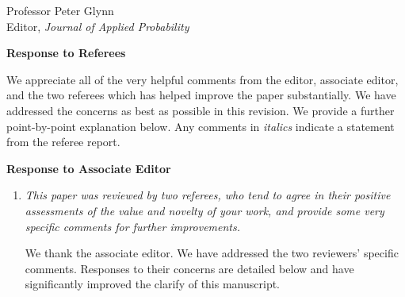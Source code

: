 \documentclass[11pt]{letter} %
\begin{document}

\begin{letter}{Professor
	Peter Glynn\\
	Editor, {\em Journal of Applied Probability}}



\signature{Walter Dempsey\\
University of Michigan\\
Department of Biostatistics\\
1415 Washington Heights\\
Ann Arbor, MI 48103} %


\vspace{5mm}

\newpage

{\bf Response to Referees}

We appreciate all of the very helpful comments from the editor, associate editor, and the two referees which has helped improve the paper substantially. We have addressed the concerns as best as possible in this revision. We provide a further point-by-point explanation below. Any comments in {\it italics} indicate a statement from the referee report.

{\bf Response to Associate Editor}
\begin{enumerate}
\item {\it This paper was reviewed by two referees, who tend to agree in their positive assessments of the value and novelty of your work, and provide some very specific comments for further improvements.}

\vspace{5mm}
We thank the associate editor.  We have addressed the two reviewers' specific comments.  Responses to their concerns are detailed below and have significantly improved the clarify of this manuscript.
\vspace{5mm}


\end{enumerate}
\end{letter}
\end{document}
